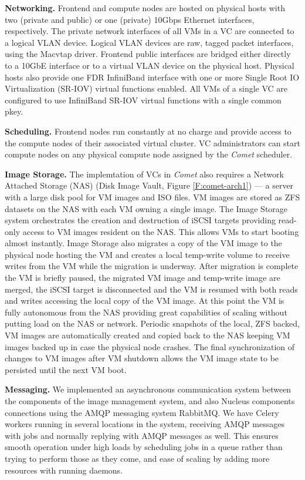 {\parindent 0pt \bf Networking.} Frontend and compute nodes are hosted on
physical hosts with two (private and public) or one (private) 10Gbps Ethernet
interfaces, respectively. The private network interfaces of all VMs in a VC are
connected to a logical VLAN device. Logical VLAN devices are raw, tagged packet
interfaces, using the Macvtap driver. Frontend public interfaces are bridged
either directly to a 10GbE interface or to a virtual VLAN device on the physical
host. Physical hosts also provide one FDR InfiniBand interface with one or more
Single Root IO Virtualization (SR-IOV) virtual functions enabled. All VMs of a
single VC are configured to use InfiniBand SR-IOV virtual functions with a
single common pkey.

{\parindent 0pt \bf Scheduling.} Frontend nodes run constantly at no charge and
provide access to the compute nodes of their associated virtual cluster. VC
administrators can start compute nodes on any physical compute node assigned by
the {\em Comet\/} scheduler.



{\parindent 0pt \bf Image Storage.} The implemtation of VCs in {\em Comet\/} also
requires a Network Attached Storage (NAS) (Disk Image Vault, Figure
\ref{F:comet-arch1}) --- a server with a large disk pool for VM images and ISO
files. VM images are stored as ZFS datasets on the NAS with each VM owning a
single image. The Image Storage system orchestrates the creation and destruction
of iSCSI targets providing read-only access to VM images resident on the NAS.
This allows VMs to start booting almost instantly. Image Storage also migrates a
copy of the VM image to the physical node hosting the VM and creates a local
temp-write volume to receive writes from the VM while the migration is underway.
After migration is complete the VM is briefly paused, the migrated VM image and
temp-write image are merged, the iSCSI target is disconnected and the VM is
resumed with both reads and writes accessing the local copy of the VM image.
At this point the VM is fully autonomous from the NAS providing great
capabilities of scaling without putting load on the NAS or network. Periodic
snapshots of the local, ZFS backed, VM images are automatically created and
copied back to the NAS keeping VM images backed up in case the physical node
crashes. The final synchronization of changes to VM images after VM shutdown
allows the VM image state to be persisted until the next VM boot.



{\parindent 0pt \bf Messaging.} We implemented an asynchronous communication
system between the components of the image management system, and also Nucleus
components connections using the AMQP messaging system RabbitMQ. We have Celery
workers running in several locations in the system, receiving AMQP messages with
jobs and normally replying with AMQP messages as well. This ensures smooth
operation under high loads by scheduling jobs in a queue rather than trying to
perform those as they come, and ease of scaling by adding more resources with
running daemons.

